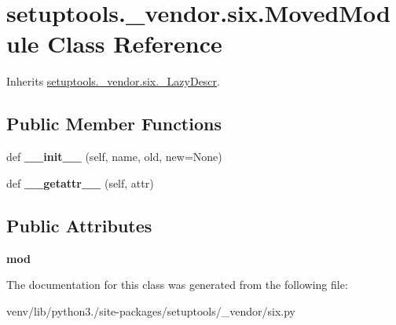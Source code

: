\hypertarget{classsetuptools_1_1__vendor_1_1six_1_1_moved_module}{}\section{setuptools.\+\_\+vendor.\+six.\+Moved\+Module Class Reference}
\label{classsetuptools_1_1__vendor_1_1six_1_1_moved_module}


Inherits \hyperlink{classsetuptools_1_1__vendor_1_1six_1_1___lazy_descr}{setuptools.\+\_\+vendor.\+six.\+\_\+\+Lazy\+Descr}.

\subsection*{Public Member Functions}
\begin{DoxyCompactItemize}
\item 
\mbox{\label{classsetuptools_1_1__vendor_1_1six_1_1_moved_module_a56c1331cdb7730849f1a3d1c608fbfaa}} 
def {\bfseries \+\_\+\+\_\+init\+\_\+\+\_\+} (self, name, old, new=None)
\item 
\mbox{\label{classsetuptools_1_1__vendor_1_1six_1_1_moved_module_ae164d42c5799dad52a620b7209f952f3}} 
def {\bfseries \+\_\+\+\_\+getattr\+\_\+\+\_\+} (self, attr)
\end{DoxyCompactItemize}
\subsection*{Public Attributes}
\begin{DoxyCompactItemize}
\item 
\mbox{\label{classsetuptools_1_1__vendor_1_1six_1_1_moved_module_a2e4387b1acf05862ad0254d1bb6929e6}} 
{\bfseries mod}
\end{DoxyCompactItemize}


The documentation for this class was generated from the following file\+:\begin{DoxyCompactItemize}
\item 
venv/lib/python3./site-\/packages/setuptools/\+\_\+vendor/six.\+py\end{DoxyCompactItemize}
